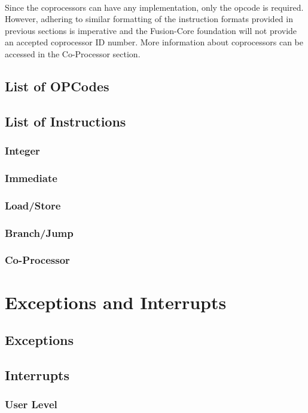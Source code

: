 \documentclass[letterpaper, 11pt]{article}
\begin{document}
\paragraph{}Since the coprocessors can have any implementation, only the opcode is required. However, adhering to similar formatting of the instruction formats provided in previous sections is imperative and the Fusion-Core foundation will not provide an accepted coprocessor ID number. More information about coprocessors can be accessed in the Co-Processor section.
	
\subsection{List of OPCodes}
\subsection{List of Instructions}
\subsubsection{Integer}
\subsubsection{Immediate}
\subsubsection{Load/Store}
\subsubsection{Branch/Jump}
\subsubsection{Co-Processor}



\section{Exceptions and Interrupts}
\subsection{Exceptions}


\subsection{Interrupts}
\subsubsection{User Level}
\end{document}
